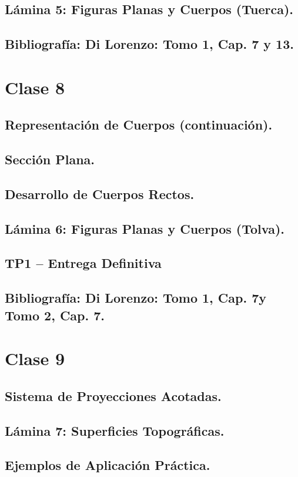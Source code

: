 \documentclass[12pt]{book}
\begin{document}
\section{Lámina 5: Figuras Planas y Cuerpos (Tuerca).}
\section{Bibliografía: Di Lorenzo: Tomo 1, Cap. 7 y 13.}

\chapter{Clase 8}
\section{Representación de Cuerpos (continuación).}
\section{Sección Plana.}
\section{Desarrollo de Cuerpos Rectos.}
\section{Lámina 6: Figuras Planas y Cuerpos (Tolva).}
\section{TP1 – Entrega Definitiva}
\section{Bibliografía: Di Lorenzo: Tomo 1, Cap. 7y Tomo 2, Cap. 7.}

\chapter{Clase 9}
\section{Sistema de Proyecciones Acotadas.}
\section{Lámina 7: Superficies Topográficas.}
\section{Ejemplos de Aplicación Práctica.}
\end{document}
